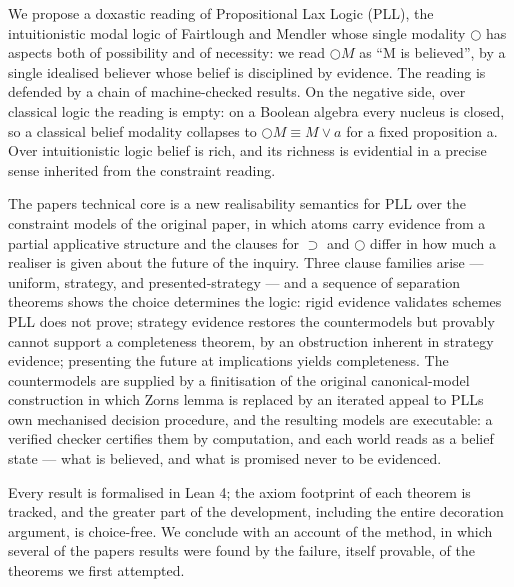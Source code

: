 We propose a doxastic reading of Propositional Lax Logic (PLL), the
intuitionistic modal logic of Fairtlough and Mendler whose single
modality \ensuremath{\bigcirc} has aspects both of possibility and of necessity: we read
\ensuremath{\bigcirc M} as ``M is believed'', by a single idealised believer whose belief is
disciplined by evidence. The reading is defended by a chain of
machine-checked results. On the negative side, over classical logic the
reading is empty: on a Boolean algebra every nucleus is closed, so a
classical belief modality collapses to \ensuremath{\bigcirc M \equiv M \vee a} for a fixed
proposition a. Over intuitionistic logic belief is rich, and its
richness is evidential in a precise sense inherited from the constraint
reading.

The paper\textquotesingle s technical core is a new realisability semantics for PLL
over the constraint models of the original paper, in which atoms carry
evidence from a partial applicative structure and the clauses for \ensuremath{\supset} and
\ensuremath{\bigcirc} differ in how much a realiser is given about the future of the
inquiry. Three clause families arise --- uniform, strategy, and
presented-strategy --- and a sequence of separation theorems shows the
choice determines the logic: rigid evidence validates schemes PLL does
not prove; strategy evidence restores the countermodels but provably
cannot support a completeness theorem, by an obstruction inherent in
strategy evidence; presenting the future at implications yields
completeness. The countermodels are supplied by a finitisation of the
original canonical-model construction in which Zorn\textquotesingle s lemma is replaced
by an iterated appeal to PLL\textquotesingle s own mechanised decision procedure, and
the resulting models are executable: a verified checker certifies them
by computation, and each world reads as a belief state --- what is
believed, and what is promised never to be evidenced.

Every result is formalised in Lean 4; the axiom footprint of each
theorem is tracked, and the greater part of the development, including
the entire decoration argument, is choice-free. We conclude with an
account of the method, in which several of the paper\textquotesingle s results were
found by the failure, itself provable, of the theorems we first
attempted.
